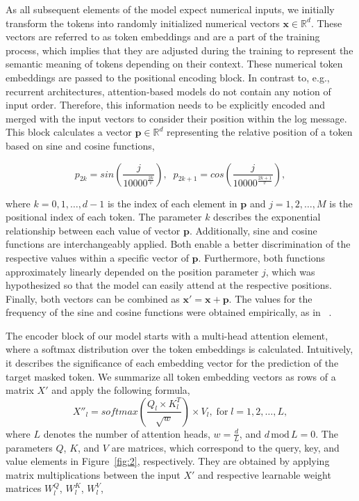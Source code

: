 As all subsequent elements of the model expect numerical inputs, we initially transform the tokens into randomly initialized numerical vectors $\mathbf{x} \in \mathbb{R}^d$. These vectors are referred to as token embeddings and are a part of the training process, which implies that they are adjusted during the training to represent the semantic meaning of tokens depending on their context. These numerical token embeddings are passed to the positional encoding block. In contrast to, e.g., recurrent architectures, attention-based models do not contain any notion of input order. Therefore, this information needs to be explicitly encoded and merged with the input vectors to consider their position within the log message. This block calculates a vector $\mathbf{p} \in \mathbb{R}^d$ representing the relative position of a token based on sine and cosine functions,

\begin{equation}\label{eq:sincosin}
    p_{2k}=sin \left( \frac{j}{10000^{\frac{2k}{v}}} \right), \;\;
    p_{2k+1}=cos \left( \frac{j}{10000^{\frac{2k + 1}{v}}} \right),
\end{equation}

where $k=0,1,\dots,d-1$ is the index of each element in $\mathbf{p}$ and $j=1,2,\dots,M$ is the positional index of each token. The parameter $k$ describes the exponential relationship between each value of vector $\mathbf{p}$. Additionally, sine and cosine functions are interchangeably applied. Both enable a better discrimination of the respective values within a specific vector of $\mathbf{p}$. Furthermore, both functions approximately linearly depended on the position parameter $j$, which was hypothesized so that the model can easily attend at the respective positions. Finally, both vectors can be combined as $\mathbf{x'} = \mathbf{x} + \mathbf{p}$. The values for the frequency of the sine and cosine functions were obtained empirically, as in ~\cite{vaswani2017attention}.

The encoder block of our model starts with a multi-head attention element, where a softmax distribution over the token embeddings is calculated. Intuitively, it describes the significance of each embedding vector for the prediction of the target masked token. We summarize all token embedding vectors as rows of a matrix $X'$ and apply the following formula,
\begin{equation}
    X''_l=softmax \left( \frac{Q_l \times K^T_l}{\sqrt{w}} \right) \times V_l, \; \text{for} \; l = 1, 2, \dots, L,
\end{equation}
where $L$ denotes the number of attention heads, $w = \frac{d}{L}$, and $d \, \text{mod} \, L = 0$. The parameters $Q$, $K$, and $V$ are matrices, which correspond to the query, key, and value elements in Figure~\ref{fig:2}, respectively. They are obtained by applying matrix multiplications between the input $X'$ and respective learnable weight matrices $W_{l}^{Q}$, $W_{l}^{K}$, $W_{l}^{V}$,

